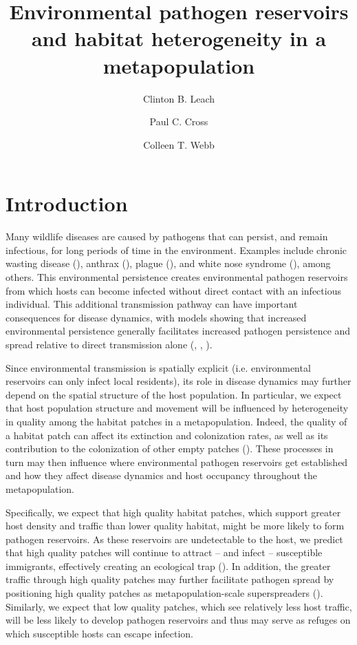 \documentclass{svjour3}
\begin{document}
\title{Environmental pathogen reservoirs and habitat heterogeneity in a metapopulation}

\author{Clinton B. Leach \and Paul C. Cross \and Colleen T. Webb}




\maketitle

\section{Introduction}
\label{intro}

Many wildlife diseases are caused by pathogens that can persist, and remain infectious, for long periods of time in the environment.  Examples include chronic wasting disease (\cite{Miller2006}), anthrax (\cite{Dragon1995}), plague (\cite{Eisen2008}), and white nose syndrome (\cite{Lindner2011}), among others.  This environmental persistence creates environmental pathogen reservoirs from which hosts can become infected without direct contact with an infectious individual.  This additional transmission pathway can have important consequences for disease dynamics, with models showing that increased environmental persistence generally facilitates increased pathogen persistence and spread relative to direct transmission alone (\cite{Almberg2011}, \cite{Sharp2011}, \cite{Breban2009}). 

Since environmental transmission is spatially explicit (i.e. environmental reservoirs can only infect local residents), its role in disease dynamics may further depend on the spatial structure of the host population.  In particular, we expect that host population structure and movement will be influenced by heterogeneity in quality among the habitat patches in a metapopulation.  Indeed, the quality of a habitat patch can affect its extinction and colonization rates, as well as its contribution to the colonization of other empty patches (\cite{Moilanen1998}).  These processes in turn may then influence where environmental pathogen reservoirs get established and how they affect disease dynamics and host occupancy throughout the metapopulation.  

Specifically, we expect that high quality habitat patches, which support greater host density and traffic than lower quality habitat, might be more likely to form pathogen reservoirs.  As these reservoirs are undetectable to the host, we predict that high quality patches will continue to attract -- and infect -- susceptible immigrants, effectively creating an ecological trap (\cite{Almberg2011}).  In addition, the greater traffic through high quality patches may further facilitate pathogen spread by positioning high quality patches as metapopulation-scale superspreaders (\cite{Paull2012}).  Similarly, we expect that low quality patches, which see relatively less host traffic, will be less likely to develop pathogen reservoirs and thus may serve as refuges on which susceptible hosts can escape infection.  
\end{document}
